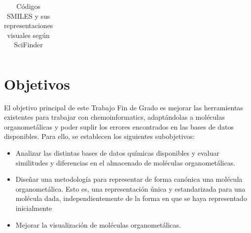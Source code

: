 \begin{landscape}
\begin{table}
\begin{minipage}{.5\linewidth}
\begin{tabular}{m{5cm}>{\centering\arraybackslash}m{4cm}}
        \hline
        \end{tabular}
    \caption{Códigos SMILES y sus representaciones visuales según SciFinder}
    \label{tabla:tabla_peq_intro_sciFinder}
  \end{minipage}
\end{table}
\end{landscape}





\section{Objetivos}
El objetivo principal de este Trabajo Fin de Grado es mejorar las herramientas existentes para trabajar con chemoinformatics, adaptándolas a moléculas organometálicas y poder suplir los errores encontrados en las bases de datos disponibles. Para ello, se establecen los siguientes subobjetivos:
\begin{itemize}
    \item Analizar las distintas bases de datos químicas disponibles y evaluar similitudes y diferencias en el almacenado de moléculas organometálicas.
    \item Diseñar una metodología para representar de forma canónica una molécula organometálica. Esto es, una representación única y estandarizada para una molécula dada, independientemente de la forma en que se haya representado inicialmente
    \item Mejorar la visualización de moléculas organometálicas.
\end{itemize} 

